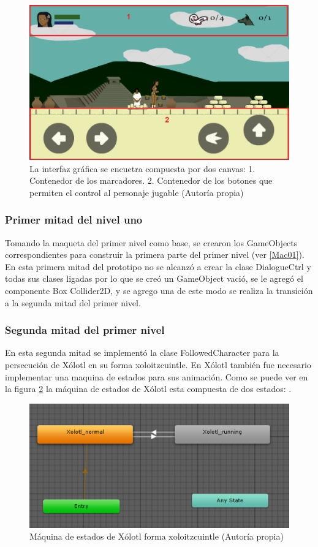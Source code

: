\begin{figure}
  \centering
   \includegraphics[width=0.4 \textwidth]{05TrabajoRealizado/03Unity/imagenes/03Interfaz}
  \caption{La interfaz gráfica se encuetra compuesta por dos canvas: 1. Contenedor de los marcadores. 2. Contenedor de los botones que permiten el control al personaje jugable (Autoría propia)}
  \label{figCanvasM}
\end{figure}

\subsubsection{Primer mitad del nivel uno}
Tomando la maqueta del primer nivel como base, se crearon los GameObjects 
correspondientes para construir la primera parte del primer nivel (ver \ref{Mac01}). 
 En esta primera mitad del prototipo no se alcanzó a crear la clase DialogueCtrl y todas sus clases ligadas por lo que se creó un GameObject vació, se le agregó el componente Box Collider2D, y se agrego una  de este modo se realiza la transición a la segunda mitad del primer nivel.
 
 \subsubsection{Segunda mitad del primer nivel}
 En esta segunda mitad se implementó la clase FollowedCharacter para la persecución 
 de Xólotl en su forma xoloitzcuintle. En Xólotl también fue necesario implementar 
 una maquina de estados para sus animación. Como se puede ver en la figura \ref{figAniXolo} la  máquina de estados de Xólotl esta compuesta de dos estados: .
 
 \begin{figure}
  \centering
   \includegraphics[width=0.4 \textwidth]{05TrabajoRealizado/03Unity/imagenes/03MaquinaEstadosXolotl}
  \caption{Máquina de estados de Xólotl forma xoloitzcuintle (Autoría propia)}
  \label{figAniXolo}
\end{figure}